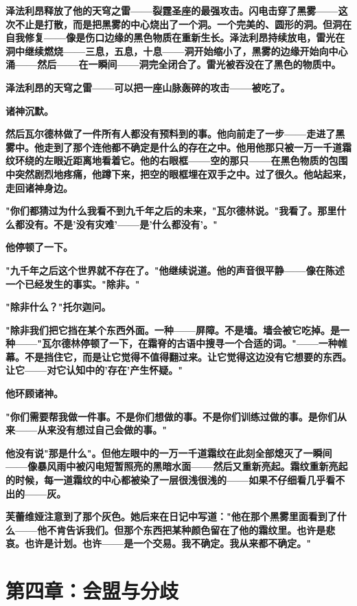 \documentclass[12pt,a4paper,openany]{ctexbook}
\begin{document}
\textbf{泽法利昂释放了他的天穹之雷——裂霆圣座的最强攻击。闪电击穿了黑雾——这次不止是打散，而是把黑雾的中心烧出了一个洞。一个完美的、圆形的洞。但洞在自我修复——像是伤口边缘的黑色物质在重新生长。泽法利昂持续放电，雷光在洞中继续燃烧——三息，五息，十息——洞开始缩小了，黑雾的边缘开始向中心涌——然后——在一瞬间——洞完全闭合了。雷光被吞没在了黑色的物质中。}


\textbf{泽法利昂的天穹之雷——可以把一座山脉轰碎的攻击——被吃了。}


\textbf{诸神沉默。}


\textbf{然后瓦尔德林做了一件所有人都没有预料到的事。他向前走了一步——走进了黑雾中。他走到了那个连他都不确定是什么的存在之中。他用他那只被一万一千道霜纹环绕的左眼近距离地看着它。他的右眼框——空的那只——在黑色物质的包围中突然剧烈地疼痛，他蹲下来，把空的眼框埋在双手之中。过了很久。他站起来，走回诸神身边。}


\textbf{"你们都猜过为什么我看不到九千年之后的未来，"瓦尔德林说。"我看了。那里什么都没有。不是'没有灾难'——是'什么都没有'。"}


\textbf{他停顿了一下。}


\textbf{"九千年之后这个世界就不存在了。"他继续说道。他的声音很平静——像在陈述一个已经发生的事实。"除非。"}


\textbf{"除非什么？"托尔迦问。}


\textbf{"除非我们把它挡在某个东西外面。一种——屏障。不是墙。墙会被它吃掉。是一种——"瓦尔德林停顿了一下，在霜脊的古语中搜寻一个合适的词。"——一种帷幕。不是挡住它，而是让它觉得不值得翻过来。让它觉得这边没有它想要的东西。让它——对它认知中的'存在'产生怀疑。"}


\textbf{他环顾诸神。}


\textbf{"你们需要帮我做一件事。不是你们想做的事。不是你们训练过做的事。是你们从来——从来没有想过自己会做的事。"}


\textbf{他没有说"那是什么"。但他左眼中的一万一千道霜纹在此刻全部熄灭了一瞬间——像暴风雨中被闪电短暂照亮的黑暗水面——然后又重新亮起。霜纹重新亮起的时候，每一道霜纹的中心都被染了一层很浅很浅的——如果不仔细看几乎看不出的——灰。}


\textbf{芙蕾维娅注意到了那个灰色。她后来在日记中写道："他在那个黑雾里面看到了什么——他不肯告诉我们。但那个东西把某种颜色留在了他的霜纹里。也许是悲哀。也许是计划。也许——是一个交易。我不确定。我从来都不确定。"}


\section*{第四章：会盟与分歧}
\end{document}

